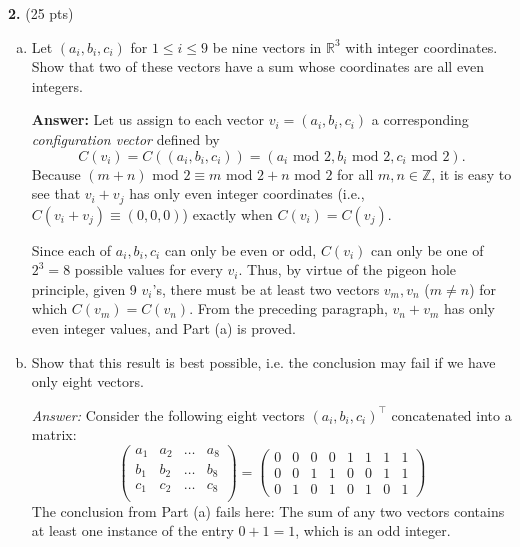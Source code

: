 \documentclass[11pt]{article}
\begin{document}
\newpage


\noindent \textbf{2.} (25 pts)
\begin{enumerate}[(a)]
	\item Let $(a_i, b_i, c_i)$ for $1 \leq i \leq 9$ be nine vectors in $\mathbb{R}^3$ with integer coordinates. Show that two of these vectors have a sum whose coordinates are all even integers.
	
	\textbf{Answer:} Let us assign to each vector $v_i = (a_i,b_i,c_i)$ a corresponding \textit{configuration vector} defined by 
	\begin{equation*}
	C(v_i) = C((a_i,b_i,c_i)) = (a_i \text{ mod } 2, b_i \text{ mod } 2, c_i \text{ mod } 2).
	\end{equation*} 
	Because $(m+n) \text{ mod } 2 \equiv m \text{ mod }2 + n \text{ mod }2$ for all $m,n\in \mathbb{Z}$, it is easy to see that $v_i + v_j$ has only even integer coordinates (i.e., $C(v_i+v_j) \equiv (0,0,0)$) exactly when $C(v_i) = C(v_j)$.
	
	Since each of $a_i,b_i,c_i$ can only be even or odd, $C(v_i)$ can only be one of $2^3 = 8$ possible values for every $v_i$. Thus, by virtue of the pigeon hole principle, given 9 $v_i$'s, there must be at least two vectors $v_m,v_n$ ($m\neq n$) for which $C(v_m) = C(v_n)$. From the preceding paragraph, $v_n + v_m$ has only even integer values, and Part (a) is proved. 
	
	
	\item Show that this result is best possible, i.e. the conclusion may fail if we have only eight vectors. 
	
	\textit{Answer:} Consider the following eight vectors $(a_i,b_i,c_i)^\top$ concatenated into a matrix:
	\begin{equation*}
	\begin{pmatrix}
	a_1 & a_2 & \dots & a_8\\
	b_1 & b_2 & \dots & b_8\\
	c_1 & c_2 & \dots & c_8\\
	\end{pmatrix}
	=
	\begin{pmatrix}
	0&0&0&0&1&1&1&1\\
	0&0&1&1&0&0&1&1\\
	0&1&0&1&0&1&0&1
	\end{pmatrix}
	\end{equation*}
	The conclusion from Part (a) fails here: The sum of any two vectors contains at least one instance of the entry $0+1=1$, which is an odd integer.
\end{enumerate}
\end{document}
